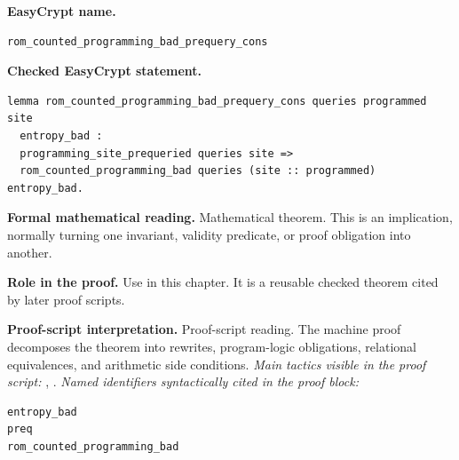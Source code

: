 \begin{formaltheorem}
\noindent\textbf{EasyCrypt name.}
\begin{lstlisting}[language=EasyCrypt,basicstyle=\ttfamily\scriptsize]
rom_counted_programming_bad_prequery_cons
\end{lstlisting}
\noindent\textbf{Checked EasyCrypt statement.}
\begin{lstlisting}[language=EasyCrypt,basicstyle=\ttfamily\scriptsize]
lemma rom_counted_programming_bad_prequery_cons queries programmed site
  entropy_bad :
  programming_site_prequeried queries site =>
  rom_counted_programming_bad queries (site :: programmed) entropy_bad.
\end{lstlisting}
\noindent\textbf{Formal mathematical reading.}
Mathematical theorem. This is an implication, normally turning one invariant, validity predicate, or proof obligation into another.

\noindent\textbf{Role in the proof.}
Use in this chapter. It is a reusable checked theorem cited by later proof scripts.

\noindent\textbf{Proof-script interpretation.}
Proof-script reading. The machine proof decomposes the theorem into rewrites, program-logic obligations, relational equivalences, and arithmetic side conditions.
\emph{Main tactics visible in the proof script:} , .
\emph{Named identifiers syntactically cited in the proof block:}
\begin{lstlisting}[language=EasyCrypt,basicstyle=\ttfamily\scriptsize]
entropy_bad
preq
rom_counted_programming_bad
\end{lstlisting}

\end{formaltheorem}

